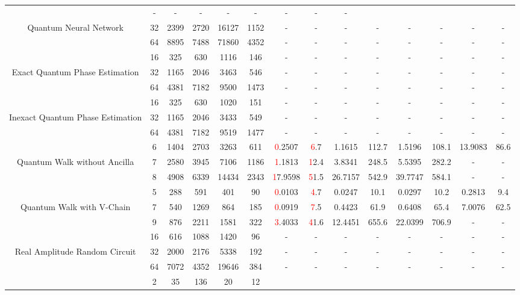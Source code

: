 \begin{table}[htb]
{\begin{tabular}{|c|c|c|c|c|c|c|c|c|c|c|c|c|c|}
 & - & -
 & - & -
 & - & -
 & - & -
 \\
Quantum Neural Network & 
32 & 2399 & 2720 & 16127 & 1152
 & - & -
 & - & -
 & - & -
 & - & -
 \\
 & 
64 & 8895 & 7488 & 71860 & 4352
 & - & -
 & - & -
 & - & -
 & - & -
 \\
\hline
 & 
16 & 325 & 630 & 1116 & 146
 & - & -
 & - & -
 & - & -
 & - & -
 \\
Exact Quantum Phase Estimation & 
32 & 1165 & 2046 & 3463 & 546
 & - & -
 & - & -
 & - & -
 & - & -
 \\
 & 
64 & 4381 & 7182 & 9500 & 1473
 & - & -
 & - & -
 & - & -
 & - & -
 \\
\hline
 & 
16 & 325 & 630 & 1020 & 151
 & - & -
 & - & -
 & - & -
 & - & -
 \\
Inexact Quantum Phase Estimation & 
32 & 1165 & 2046 & 3433 & 549
 & - & -
 & - & -
 & - & -
 & - & -
 \\
 & 
64 & 4381 & 7182 & 9519 & 1477
 & - & -
 & - & -
 & - & -
 & - & -
 \\
\hline
 & 
6 & 1404 & 2703 & 3263 & 611
 & \textcolor{red}0.2507 & \textcolor{red}6.7
 & 1.1615 & 112.7
 & 1.5196 & 108.1
 & 13.9083 & 86.6
 \\
Quantum Walk without Ancilla & 
7 & 2580 & 3945 & 7106 & 1186
 & \textcolor{red}1.1813 & \textcolor{red}12.4
 & 3.8341 & 248.5
 & 5.5395 & 282.2
 & - & -
 \\
 & 
8 & 4908 & 6339 & 14434 & 2343
 & \textcolor{red}17.9598 & \textcolor{red}51.5
 & 26.7157 & 542.9
 & 39.7747 & 584.1
 & - & -
 \\
\hline
 & 
5 & 288 & 591 & 401 & 90
 & \textcolor{red}0.0103 & \textcolor{red}4.7
 & 0.0247 & 10.1
 & 0.0297 & 10.2
 & 0.2813 & 9.4
 \\
Quantum Walk with V-Chain & 
7 & 540 & 1269 & 864 & 185
 & \textcolor{red}0.0919 & \textcolor{red}7.5
 & 0.4423 & 61.9
 & 0.6408 & 65.4
 & 7.0076 & 62.5
 \\
 & 
9 & 876 & 2211 & 1581 & 322
 & \textcolor{red}3.4033 & \textcolor{red}41.6
 & 12.4451 & 655.6
 & 22.0399 & 706.9
 & - & -
 \\
\hline
 & 
16 & 616 & 1088 & 1420 & 96
 & - & -
 & - & -
 & - & -
 & - & -
 \\
Real Amplitude Random Circuit & 
32 & 2000 & 2176 & 5338 & 192
 & - & -
 & - & -
 & - & -
 & - & -
 \\
 & 
64 & 7072 & 4352 & 19646 & 384
 & - & -
 & - & -
 & - & -
 & - & -
 \\
\hline
 & 
2 & 35 & 136 & 20 & 12

\end{tabular}}
\end{table}
